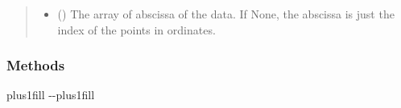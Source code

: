 \documentclass[letterpaper,10pt,english]{sphinxmanual}
\begin{document}
\begin{fulllineitems}
\begin{fulllineitems}
\begin{quote}
\begin{description}
\begin{itemize}
\item {} 
\sphinxAtStartPar
{} (\sphinxstyleliteralemphasis{\sphinxupquote{, }}) \textendash{} The array of abscissa of the data. If None, the abscissa is just the index of the points in ordinates.

\end{itemize}

\end{description}\end{quote}

\end{fulllineitems}

\subsubsection*{Methods}


\begin{savenotes}
\sphinxatlongtablestart
\sphinxthistablewithglobalstyle
\sphinxthistablewithnovlinesstyle
\makeatletter
  \LTleft \@totalleftmargin plus1fill
  \LTright\dimexpr\columnwidth-\@totalleftmargin-\linewidth\relax plus1fill
\makeatother
\begin{longtable}{}
\sphinxtoprule
\endfirsthead

\\
\sphinxtoprule
\endhead

\sphinxbottomrule
{}\\
\endfoot

\endlastfoot
\sphinxtableatstartofbodyhook


\end{longtable}
\end{savenotes}
\end{fulllineitems}
\end{document}
